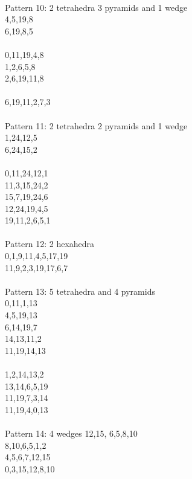\documentclass[twocolumn]{article}
\begin{document}
 \\
\tiny Pattern 10: 2 tetrahedra 3 pyramids and 1 wedge \\
\tiny 4,5,19,8 \\
\tiny 6,19,8,5 \\
\tiny \\
\tiny 0,11,19,4,8\\
\tiny 1,2,6,5,8\\
\tiny 2,6,19,11,8\\
\tiny \\
\tiny 6,19,11,2,7,3\\


 \\
\tiny Pattern 11: 2 tetrahedra 2 pyramids and 1 wedge \\
\tiny 1,24,12,5 \\
\tiny 6,24,15,2 \\
\tiny  \\
\tiny 0,11,24,12,1 \\
\tiny 11,3,15,24,2 \\
\tiny 15,7,19,24,6 \\
\tiny 12,24,19,4,5 \\
\tiny 19,11,2,6,5,1 \\

 \\
\tiny Pattern 12: 2 hexahedra \\
\tiny 0,1,9,11,4,5,17,19 \\
\tiny 11,9,2,3,19,17,6,7 \\

 \\
\tiny Pattern 13: 5 tetrahedra and 4 pyramids \\
\tiny 0,11,1,13 \\
\tiny 4,5,19,13 \\
\tiny  6,14,19,7 \\
\tiny  14,13,11,2 \\
\tiny  11,19,14,13\\
\tiny    \\
\tiny  1,2,14,13,2 \\
\tiny  13,14,6,5,19 \\
\tiny  11,19,7,3,14 \\
\tiny  11,19,4,0,13 \\

 \\
\tiny Pattern 14: 4 wedges
\tiny 12,15, 6,5,8,10 \\
\tiny 8,10,6,5,1,2 \\
\tiny 4,5,6,7,12,15 \\
\tiny 0,3,15,12,8,10 \\
\end{document}
